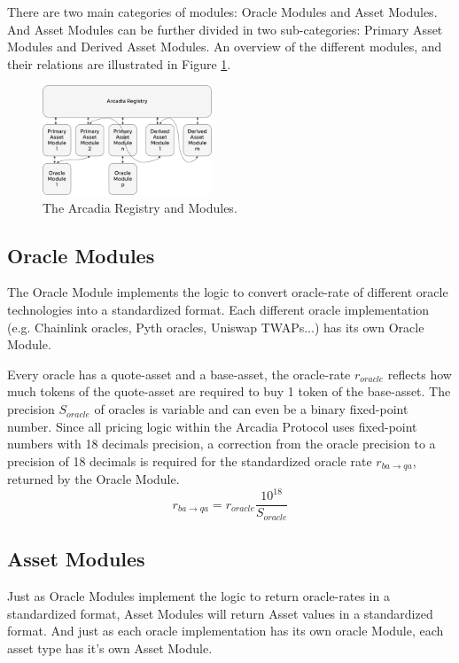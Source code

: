 \documentclass[sigconf,nonacm]{acmart}
\begin{document}
There are two main categories of modules: Oracle Modules and Asset Modules.
And Asset Modules can be further divided in two sub-categories: Primary Asset Modules and Derived Asset Modules.
An overview of the different modules, and their relations are illustrated in Figure \ref{fig:arcadia-registry}.

\begin{figure}
    \centering
    \includegraphics[width=0.45\textwidth]{images/Arcadia-Registry.png}
    \caption{The Arcadia Registry and Modules. \label{fig:arcadia-registry}}
\end{figure}

\subsection{Oracle Modules}
The Oracle Module implements the logic to convert oracle-rate of different oracle technologies into a standardized format.
Each different oracle implementation (e.g. Chainlink oracles, Pyth oracles, Uniswap TWAPs...) has its own Oracle Module.

Every oracle has a quote-asset and a base-asset, the oracle-rate $r_{oracle}$ reflects how much tokens of the quote-asset are required to buy 1 token of the base-asset.
The precision $S_{oracle}$ of oracles is variable and can even be a binary fixed-point number.
Since all pricing logic within the Arcadia Protocol uses fixed-point numbers with 18 decimals precision,
a correction from the oracle precision to a precision of 18 decimals is required for the standardized oracle rate $r_{ba\rightarrow qa}$, returned by the Oracle Module.
\begin{equation}
    \label{eq:oracle-module}
    r_{ba\rightarrow qa} = r_{oracle} \frac{10^{18}}{S_{oracle}}
\end{equation}

\subsection{Asset Modules}
Just as Oracle Modules implement the logic to return oracle-rates in a standardized format, Asset Modules will return Asset values in a standardized format.
And just as each oracle implementation has its own oracle Module, each asset type has it's own Asset Module.
\end{document}
